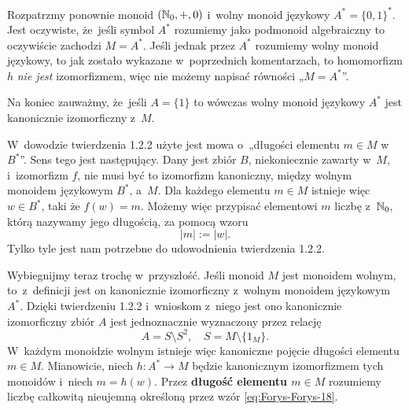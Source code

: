 \documentclass[a4paper,11pt]{article}
\begin{document}
Rozpatrzmy ponownie monoid $( \mathbb{N}_{ 0 }, +, 0 )$ i~wolny monoid językowy
$A^{ * } = \{ 0, 1 \}^{ * }$. Jest oczywiste, że~jeśli symbol $A^{ * }$ rozumiemy
jako podmonoid algebraiczny to oczywiście zachodzi $M = A^{ * }$.
Jeśli jednak przez $A^{ * }$ rozumiemy wolny monoid językowy, to jak zostało
wykazane w~poprzednich komentarzach, to homomorfizm $h$ \textit{nie jest}
izomorfizmem, więc nie możemy napisać równości „$M = A^{ * }$”.

Na koniec zauważmy, że~jeśli $A = \{ 1 \}$ to wówczas wolny monoid językowy
$A^{ * }$ jest kanonicznie izomorficzny z~$M$.

\vspace{\spaceFour}





\start {} W~dowodzie twierdzenia 1.2.2 użyte jest mowa o~„długości elementu $m \in M$ w~$B^{ * }$”. Sens tego jest następujący. Dany jest zbiór $B$, niekoniecznie zawarty w~$M$, i~izomorfizm $f$, nie musi być to izomorfizm kanoniczny, między wolnym monoidem językowym $B^{ * }$, a~$M$. Dla każdego elementu $m \in M$ istnieje więc $w \in B^{ * }$, taki że $f( w ) = m$. Możemy więc przypisać elementowi $m$ liczbę z~$\mathbb{N}_{ 0 }$, którą nazywamy jego długością, za pomocą wzoru
\begin{equation}
  \label{eq:Forys-Forys-17}
  | m | := | w |.
\end{equation}
Tylko tyle jest nam potrzebne do udowodnienia twierdzenia 1.2.2.

Wybiegnijmy teraz trochę w~przyszłość. Jeśli monoid $M$ jest monoidem
wolnym, to~z~definicji jest on kanonicznie izomorficzny z~wolnym monoidem
językowym $A^{ * }$. Dzięki twierdzeniu 1.2.2 i~wnioskom z~niego jest ono
kanonicznie izomorficzny zbiór $A$ jest jednoznacznie wyznaczony przez
relację
\begin{equation}
  \label{eq:Forys-Forys-18}
  A = S \setminus S^{ 2 }, \quad
  S = M \setminus \{ 1_{ M } \}.
\end{equation}
W~każdym monoidzie wolnym istnieje więc kanoniczne pojęcie długości
elementu $m \in M$. Mianowicie, niech $h : A^{ * } \to M$ będzie kanonicznym
izomorfizmem tych monoidów i~niech $m = h( w )$. Przez \textbf{długość
  elementu $m \in M$} rozumiemy liczbę całkowitą nieujemną określoną przez
wzór \eqref{eq:Forys-Forys-18}.

\vspace{\spaceFour}
\end{document}
